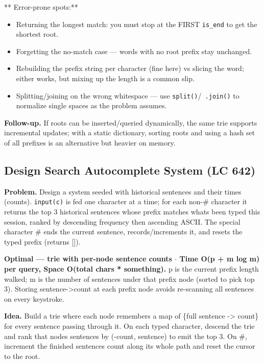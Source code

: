 \documentclass[11pt]{article}
\providecommand{\tightlist}{\setlength{\itemsep}{1pt}\setlength{\parskip}{0pt}}
\begin{document}
** Error-prone spots:**

\begin{itemize}
\tightlist
\item
  Returning the longest match: you must stop at the FIRST \texttt{is\_end} to get the shortest root.
\item
  Forgetting the no-match case --- words with no root prefix stay unchanged.
\item
  Rebuilding the prefix string per character (fine here) vs slicing the word; either works, but mixing up the length is a common slip.
\item
  Splitting/joining on the wrong whitespace --- use \texttt{split()}/\texttt{\textquotesingle{}\ \textquotesingle{}.join()} to normalize single spaces as the problem assumes.
\end{itemize}

\textbf{Follow-up.} If roots can be inserted/queried dynamically, the same trie supports incremental updates; with a static dictionary, sorting roots and using a hash set of all prefixes is an alternative but heavier on memory.

\subsection{Design Search Autocomplete System (LC 642)}\label{design-search-autocomplete-system-lc-642}

\textbf{Problem.} Design a system seeded with historical sentences and their times (counts). \texttt{input(c)} is fed one character at a time; for each non-\textquotesingle\#\textquotesingle{} character it returns the top 3 historical sentences whose prefix matches what\textquotesingle s been typed this session, ranked by descending frequency then ascending ASCII. The special character \textquotesingle\#\textquotesingle{} ends the current sentence, records/increments it, and resets the typed prefix (returns {[}{]}).

\textbf{Optimal --- trie with per-node sentence counts \(\cdot\) Time O(p + m log m) per query, Space O(total chars * something).} p is the current prefix length walked; m is the number of sentences under that prefix node (sorted to pick top 3). Storing sentence-\textgreater count at each prefix node avoids re-scanning all sentences on every keystroke.

\textbf{Idea.} Build a trie where each node remembers a map of \{full sentence -\textgreater{} count\} for every sentence passing through it. On each typed character, descend the trie and rank that node\textquotesingle s sentences by (-count, sentence) to emit the top 3. On \textquotesingle\#\textquotesingle, increment the finished sentence\textquotesingle s count along its whole path and reset the cursor to the root.
\end{document}
